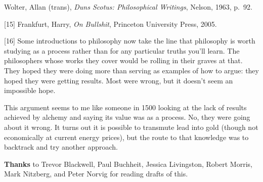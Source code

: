 Wolter, Allan (trans), \emph{Duns Scotus: Philosophical Writings},
Nelson, 1963, p.~92.

{[}15{]} Frankfurt, Harry, \emph{On Bullshit}, Princeton University
Press, 2005.

{[}16{]} Some introductions to philosophy now take the line that
philosophy is worth studying as a process rather than for any particular
truths you'll learn. The philosophers whose works they cover would be
rolling in their graves at that. They hoped they were doing more than
serving as examples of how to argue: they hoped they were getting
results. Most were wrong, but it doesn't seem an impossible hope.

This argument seems to me like someone in 1500 looking at the lack of
results achieved by alchemy and saying its value was as a process. No,
they were going about it wrong. It turns out it is possible to transmute
lead into gold (though not economically at current energy prices), but
the route to that knowledge was to backtrack and try another approach.

\textbf{Thanks} to Trevor Blackwell, Paul Buchheit, Jessica Livingston,
Robert Morris, Mark Nitzberg, and Peter Norvig for reading drafts of
this.
